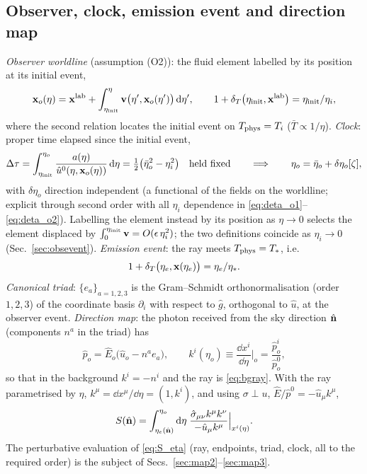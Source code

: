 \subsection{Observer, clock, emission event and direction map}
\label{sec:observer}
\emph{Observer worldline} (assumption (O2)): the fluid element labelled by its position at its initial event,
\begin{equation}
\mathbf x_o(\eta)=\mathbf x^{\rm lab}+\int_{\eta_{\rm init}}^{\eta}\mathbf v\big(\eta',\mathbf x_o(\eta')\big)\,\mathrm d\eta',\qquad
1+\delta_T\big(\eta_{\rm init},\mathbf x^{\rm lab}\big)=\eta_{\rm init}/\eta_i ,
\label{eq:worldline}
\end{equation}
where the second relation locates the initial event on $T_{\rm phys}=T_i$ ($\bar T\propto1/\eta$).  \emph{Clock}: proper time elapsed
since the initial event,
\begin{equation}
\Delta\tau=\int_{\eta_{\rm init}}^{\eta_o}\frac{a(\eta)}{\hat u^0(\eta,\mathbf x_o(\eta))}\,\mathrm d\eta=\tfrac12\big(\bar\eta_o^2-\eta_i^2\big)\quad\text{held fixed}
\qquad\Longrightarrow\qquad \eta_o=\bar\eta_o+\delta\eta_o[\zeta],
\label{eq:clock}
\end{equation}
with $\delta\eta_o$ direction independent (a functional of the fields on the worldline; explicit through second order with all
$\eta_i$ dependence in \eqref{eq:deta_o1}--\eqref{eq:deta_o2}).  Labelling the element instead by its position as $\eta\to0$
selects the element displaced by $\int_0^{\eta_{\rm init}}\mathbf v=O(\epsilon\,\eta_i^2)$; the two definitions coincide as $\eta_i\to0$
(Sec.~\ref{sec:obsevent}).
\emph{Emission event}: the ray meets $T_{\rm phys}=T_*$, i.e.
\begin{equation}
1+\delta_T\big(\eta_e,\mathbf x(\eta_e)\big)=\eta_e/\eta_* .
\label{eq:emission}
\end{equation}
\emph{Canonical triad}: $\{e_a\}_{a=1,2,3}$ is the Gram--Schmidt orthonormalisation (order $1,2,3$) of the coordinate
basis $\partial_i$ with respect to $\hat g$, orthogonal to $\hat u$, at the observer event.  \emph{Direction map}: the photon received
from the sky direction $\hat{\mathbf n}$ (components $n^a$ in the triad) has
\begin{equation}
\hat p_o=\hat E_o\big(\hat u_o-n^ae_a\big),\qquad k^i(\eta_o)\equiv\frac{\dd x^i}{\dd\eta}\Big|_o=\frac{\hat p^i_o}{\hat p^0_o},
\label{eq:dirmap}
\end{equation}
so that in the background $k^i=-n^i$ and the ray is \eqref{eq:bgray}.  With the ray parametrised by $\eta$,
$k^\mu=\dd x^\mu/\dd\eta=(1,k^i)$, and using $\sigma\perp u$, $\hat E/\hat p^0=-\hat u_\mu k^\mu$,
\begin{equation}
S(\hat{\mathbf n})=\int_{\eta_e(\hat{\mathbf n})}^{\eta_o}\mathrm d\eta\;\frac{\hat\sigma_{\mu\nu}k^\mu k^\nu}{-\hat u_\mu k^\mu}\Big|_{x^i(\eta)} .
\label{eq:S_eta}
\end{equation}
The perturbative evaluation of \eqref{eq:S_eta} (ray, endpoints, triad, clock, all to the required order) is the
subject of Secs.~\ref{sec:map2}--\ref{sec:map3}.

